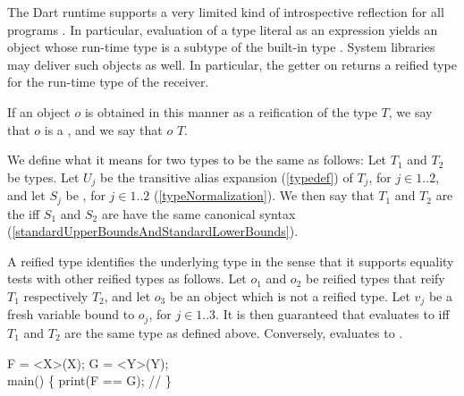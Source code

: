 \documentclass[makeidx]{article}
\begin{document}
{\LMHash{}%
The Dart runtime supports a very limited kind of introspective reflection
for all programs
.
In particular, evaluation of a type literal as an expression yields
an object whose run-time type is a subtype of the built-in type .
System libraries may deliver such objects as well.
In particular, the getter  on 
returns a reified type for the run-time type of the receiver.

\LMHash{}%
If an object $o$ is obtained in this manner
as a reification of the type $T$,
we say that $o$ is a ,
and we say that $o$  $T$.

\LMHash{}%
We define what it means for two types to be the same as follows:
Let $T_1$ and $T_2$ be types.
Let $U_j$ be the transitive alias expansion
(\ref{typedef}) of $T_j$, for $j \in 1 .. 2$,
and let $S_j$ be , for $j \in 1 .. 2$
(\ref{typeNormalization}).
We then say that $T_1$ and $T_2$ are the 
if{}f $S_1$ and $S_2$ are have the same canonical syntax
(\ref{standardUpperBoundsAndStandardLowerBounds}).

\LMHash{}%
A reified type identifies the underlying type in the sense that
it supports equality tests with other reified types as follows.
Let $o_1$ and $o_2$ be reified types that reify $T_1$ respectively $T_2$,
and let $o_3$ be an object which is not a reified type.
Let $v_j$ be a fresh variable bound to $o_j$, for $j \in 1 .. 3$.
It is then guaranteed that  evaluates to \TRUE{}
if{}f $T_1$ and $T_2$ are the same type as defined above.
Conversely,  evaluates to \FALSE.


\begin{dartCode}
\TYPEDEF{} F = \VOID{} \FUNCTION{}<X>(X);
\TYPEDEF{} G = \VOID{} \FUNCTION{}<Y>(Y);
\\
\VOID{} main() \{
  print(F == G); // 
\}
\end{dartCode}

}
\end{document}
